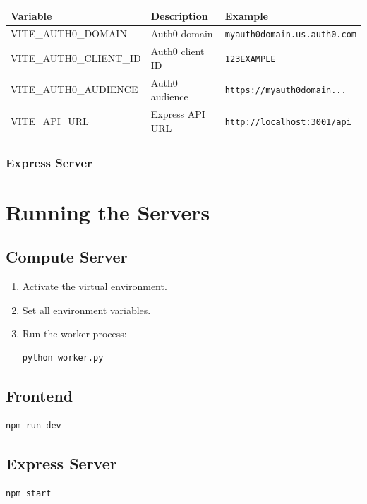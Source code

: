 \documentclass{article}
\begin{document}
\begin{tabularx}{\textwidth}{lXl}
\toprule
\textbf{Variable} & \textbf{Description} & \textbf{Example} \\
\midrule
VITE\_AUTH0\_DOMAIN & Auth0 domain & \texttt{myauth0domain.us.auth0.com} \\
VITE\_AUTH0\_CLIENT\_ID & Auth0 client ID & \texttt{123EXAMPLE} \\
VITE\_AUTH0\_AUDIENCE & Auth0 audience & \texttt{https://myauth0domain...} \\
VITE\_API\_URL & Express API URL & \texttt{http://localhost:3001/api} \\
\bottomrule
\end{tabularx}

\subsubsection*{Express Server}

\section{Running the Servers}

\subsection{Compute Server}
\begin{enumerate}
    \item Activate the virtual environment.
    \item Set all environment variables.
    \item Run the worker process:
\begin{Verbatim}[fontsize=\small]
python worker.py
\end{Verbatim}
\end{enumerate}

\subsection{Frontend}
\begin{Verbatim}[fontsize=\small]
npm run dev
\end{Verbatim}

\subsection{Express Server}
\begin{Verbatim}[fontsize=\small]
npm start
\end{Verbatim}
\end{document}
